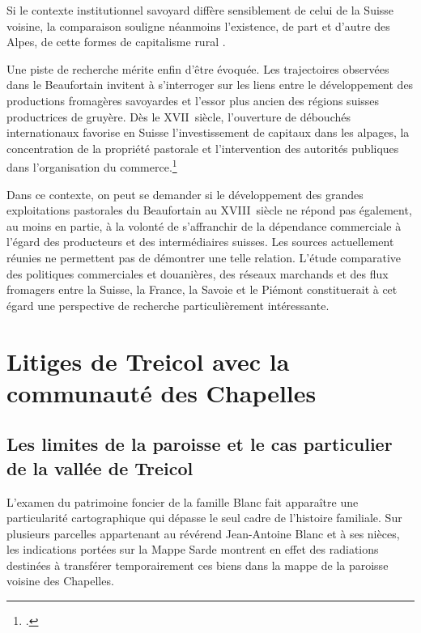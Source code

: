 \documentclass[12pt,a4paper]{report}
\begin{document}
	 Si le contexte institutionnel savoyard diffère sensiblement de celui de la Suisse voisine, la comparaison souligne néanmoins l'existence, de part et d'autre des Alpes, de cette formes de capitalisme rural .
	
	Une piste de recherche mérite enfin d'être évoquée. Les trajectoires observées dans le Beaufortain invitent à s'interroger sur les liens entre le développement des productions fromagères savoyardes et l'essor plus ancien des régions suisses productrices de gruyère. Dès le XVII\ieme\ siècle, l'ouverture de débouchés internationaux favorise en Suisse l'investissement de capitaux dans les alpages, la concentration de la propriété pastorale et l'intervention des autorités publiques dans l'organisation du commerce.\footcite[44, 60, 159]{RuffieuxBodmer1972HistoireGruyere}
	
	Dans ce contexte, on peut se demander si le développement des grandes exploitations pastorales du Beaufortain au XVIII\ieme\ siècle ne répond pas également, au moins en partie, à la volonté de s'affranchir de la dépendance commerciale à l'égard des producteurs et des intermédiaires suisses. Les sources actuellement réunies ne permettent pas de démontrer une telle relation. L'étude comparative des politiques commerciales et douanières, des réseaux marchands et des flux fromagers entre la Suisse, la France, la Savoie et le Piémont constituerait à cet égard une perspective de recherche particulièrement intéressante.
	
\section{Litiges de Treicol avec la communauté des Chapelles }	
\label{sec:LesChappelles}
	
	
	
	\subsection{Les limites de la paroisse et le cas particulier de la vallée de Treicol}
	
	L'examen du patrimoine foncier de la famille Blanc fait apparaître une particularité cartographique qui dépasse le seul cadre de l'histoire familiale. Sur plusieurs parcelles appartenant au révérend Jean-Antoine Blanc et à ses nièces, les indications portées sur la Mappe Sarde montrent en effet des radiations destinées à transférer temporairement ces biens dans la mappe de la paroisse voisine des Chapelles.
	
\end{document}
